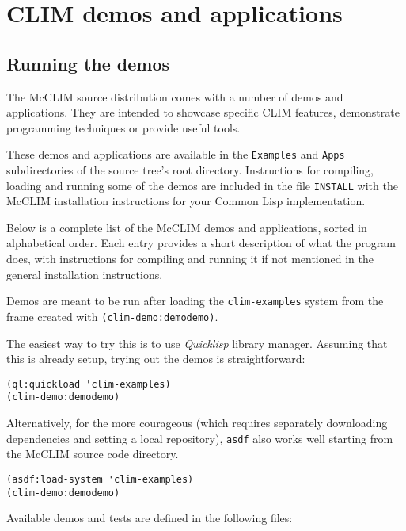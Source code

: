 \chapter{CLIM demos and applications}

\section{Running the demos}

The McCLIM source distribution comes with a number of demos and
applications.  They are intended to showcase specific CLIM features,
demonstrate programming techniques or provide useful tools.

These demos and applications are available in the \texttt{Examples}
and \texttt{Apps} subdirectories of the source tree's root directory.
Instructions for compiling, loading and running some of the demos are
included in the file \texttt{INSTALL} with the McCLIM installation
instructions for your Common Lisp implementation.

Below is a complete list of the McCLIM demos and applications, sorted in
alphabetical order.  Each entry provides a short description of what the
program does, with instructions for compiling and running it if not
mentioned in the general installation instructions.

Demos are meant to be run after loading the \texttt{clim-examples}
system from the frame created with \texttt{(clim-demo:demodemo)}.

The easiest way to try this is to use \emph{Quicklisp} library
manager. Assuming that this is already setup, trying out the demos is
straightforward:

\begin{verbatim}
(ql:quickload 'clim-examples)
(clim-demo:demodemo)
\end{verbatim}


Alternatively, for the more courageous (which requires separately
downloading dependencies and setting a local repository),
\texttt{asdf} also works well starting from the McCLIM source code
directory.

\begin{verbatim}
(asdf:load-system 'clim-examples)
(clim-demo:demodemo)
\end{verbatim}

Available demos and tests are defined in the following files:

